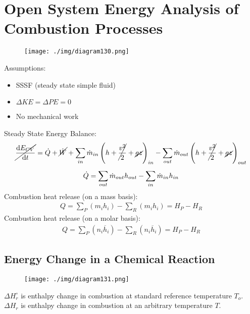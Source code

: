 \section{Open System Energy Analysis of Combustion Processes}
\begin{figure}[H]
  \centering
  \texttt{[image: ./img/diagram130.png]}
  \caption{}
\end{figure}
Assumptions:
\begin{itemize}[noitemsep]
  \item SSSF (steady state simple fluid)
  \item $\Delta KE = \Delta PE = 0$
  \item No mechanical work
\end{itemize}
Steady State Energy Balance:
\begin{gather}
  \cancel{\frac{\dif E_{CV}}{\dif t}} = \dot{Q} + \cancel{\dot{W}} + \sum_{in}\dot{m}_{in}\left(h+\cancel{\frac{v^2}{2}}+\cancel{gz}\right)_{in} - \sum_{out}\dot{m}_{out}\left(h+\cancel{\frac{v^2}{2}}+\cancel{gz}\right)_{out} \\[5pt]
  \dot{Q} = \sum_{out}\dot{m}_{out}h_{out} - \sum_{in}\dot{m}_{in}h_{in}
\end{gather}
Combustion heat release (on a mass basis):
\begin{gather}
  Q = \sum_{P}(m_i h_i) - \sum_{R}(m_i h_i) = H_P - H_R
\end{gather}
Combustion heat release (on a molar basis):
\begin{gather}
  Q = \sum_{P}(n_i \overline{h}_i) - \sum_{R}(n_i \overline{h}_i) = H_P - H_R
\end{gather}
\subsection{Energy Change in a Chemical Reaction}
\begin{figure}[H]
  \centering
  \texttt{[image: ./img/diagram131.png]}
  \caption{}
\end{figure}
$\Delta H_r^\circ$ is enthalpy change in combustion at standard reference temperature $T_o$. \\
$\Delta H_r$ is enthalpy change in combustion at an arbitrary temperature $T$.
